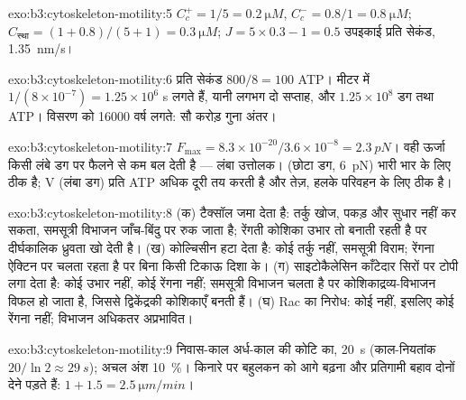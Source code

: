 \begin{solution}{exo:b3:cytoskeleton-motility:5}
$C_{c}^{+} = 1/5 = \qty{0.2}{\micro M}$, $C_{c}^{-} = 0.8/1 =
\qty{0.8}{\micro M}$; $C_{\text{स्था}} = (1 + 0.8)/(5 + 1) = \qty{0.3}{\micro
M}$; $J = 5\times 0.3 - 1 = 0.5$ उपइकाई प्रति सेकंड, \qty{1.35}{nm/s}।
\end{solution}

\begin{solution}{exo:b3:cytoskeleton-motility:6}
प्रति सेकंड $800/8 = 100$ ATP। मीटर में $1/(8\times 10^{-7}) =
1.25\times 10^{6}$ s लगते हैं, यानी लगभग दो सप्ताह, और $1.25\times 10^{8}$
डग तथा ATP। विसरण को \num{16000} वर्ष लगते: सौ करोड़ गुना
अंतर।
\end{solution}

\begin{solution}{exo:b3:cytoskeleton-motility:7}
$F_{\max} = 8.3\times 10^{-20}/3.6\times 10^{-8} = \qty{2.3}{pN}$। वही
ऊर्जा किसी लंबे डग पर फैलने से कम बल देती है --- लंबा उत्तोलक।
 (छोटा डग, \qty{6}{pN}) भारी भार के लिए ठीक है;  V (लंबा
डग) प्रति ATP अधिक दूरी तय करती है और तेज़, हलके परिवहन के लिए ठीक है।
\end{solution}

\begin{solution}{exo:b3:cytoskeleton-motility:8}
(क) टैक्सॉल  जमा देता है: तर्कु खोज, पकड़ और सुधार नहीं
कर सकता, समसूत्री विभाजन जाँच-बिंदु पर रुक जाता है; रेंगती कोशिका उभार
तो बनाती रहती है पर दीर्घकालिक ध्रुवता खो देती है। (ख) कोल्चिसीन
 हटा देता है: कोई तर्कु नहीं, समसूत्री विराम; रेंगना
ऐक्टिन पर चलता रहता है पर बिना किसी टिकाऊ दिशा के। (ग) साइटोकैलेसिन
काँटेदार सिरों पर टोपी लगा देता है: कोई उभार नहीं, कोई रेंगना नहीं;
समसूत्री विभाजन चलता है पर कोशिकाद्रव्य-विभाजन विफल हो जाता है, जिससे
द्विकेंद्रकी कोशिकाएँ बनती हैं। (घ) Rac का निरोध: कोई  नहीं,
इसलिए कोई रेंगना नहीं; विभाजन अधिकतर अप्रभावित।
\end{solution}

\begin{solution}{exo:b3:cytoskeleton-motility:9}
निवास-काल अर्ध-काल की कोटि का, \qty{20}{s} (काल-नियतांक
$20/\ln 2 \approx \qty{29}{s}$); अचल अंश \qty{10}{\%}।
किनारे पर बहुलकन को आगे बढ़ना और प्रतिगामी बहाव दोनों देने पड़ते हैं:
$1 + 1.5 = \qty{2.5}{\micro m/min}$।
\end{solution}

